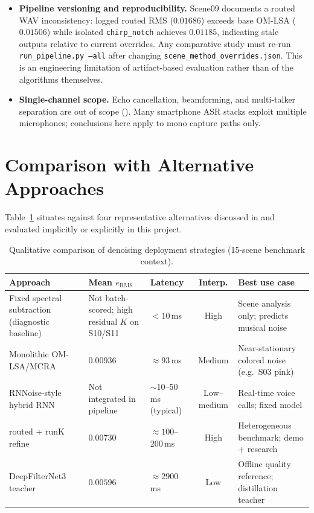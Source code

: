 \begin{itemize}
  \item \textbf{Pipeline versioning and reproducibility.}
  Scene09 documents a routed WAV inconsistency: logged routed RMS ($0.01686$) exceeds base OM-LSA ($0.01506$) while isolated \texttt{chirp\_notch} achieves $0.01185$, indicating stale outputs relative to current overrides. Any comparative study must re-run \texttt{run\_pipeline.py --all} after changing \texttt{scene\_method\_overrides.json}. This is an engineering limitation of artifact-based evaluation rather than of the algorithms themselves.

  \item \textbf{Single-channel scope.}
  Echo cancellation, beamforming, and multi-talker separation are out of scope (). Many smartphone ASR stacks exploit multiple microphones; conclusions here apply to mono capture paths only.
\end{itemize}

\section{Comparison with Alternative Approaches}
\label{sec:comparison}

Table~\ref{tab:approach_compare} situates \projectshort{} against four representative alternatives discussed in  and evaluated implicitly or explicitly in this project.

\begin{table}[H]
  \centering
  \caption{Qualitative comparison of denoising deployment strategies (15-scene benchmark context).}
  \label{tab:approach_compare}
  \footnotesize
  \setlength{\tabcolsep}{3pt}
  \begin{tabularx}{\linewidth}{@{}>{\raggedright\arraybackslash}p{1.55cm} >{\raggedright\arraybackslash}X >{\raggedright\arraybackslash}p{1.35cm} c >{\raggedright\arraybackslash}X@{}}
    \toprule
    \textbf{Approach} & \textbf{Mean $e_{\mathrm{RMS}}$} & \textbf{Latency} & \textbf{Interp.} & \textbf{Best use case} \\
    \midrule
    Fixed spectral subtraction (diagnostic baseline) & Not batch-scored; high residual $K$ on S10/S11 & $<10$\,ms & High & Scene analysis only; predicts musical noise \\
    Monolithic OM-LSA/MCRA & $0.00936$ & $\approx 93$\,ms & Medium & Near-stationary colored noise (e.g.\ S03 pink) \\
    RNNoise-style hybrid RNN & Not integrated in pipeline & $\sim$10--50\,ms (typical) & Low--medium & Real-time voice calls; fixed model \\
    \projectshort{} routed + runK refine & $0.00730$ & $\approx 100$--200\,ms & High & Heterogeneous benchmark; demo + research \\
    DeepFilterNet3 teacher & $0.00596$ & $\approx 2900$\,ms & Low & Offline quality reference; distillation teacher \\
    \bottomrule
  \end{tabularx}
\end{table}

